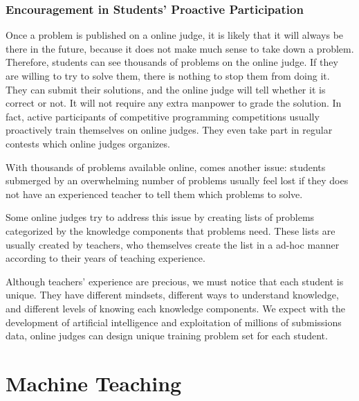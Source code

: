         \subsubsection{Encouragement in Students' Proactive Participation}

            Once a problem is published on a online judge,
            it is likely that it will always be there in the future,
            because it does not make much sense to take down a problem.
            Therefore, students can see thousands of problems on the online judge.
            If they are willing to try to solve them,
            there is nothing to stop them from doing it.
            They can submit their solutions,
            and the online judge will tell whether it is correct or not.
            It will not require any extra manpower to grade the solution.
            In fact, active participants of competitive programming competitions usually proactively
            train themselves on online judges.
            They even take part in regular contests which online judges organizes.

            With thousands of problems available online, comes another issue:
            students submerged by an overwhelming number of problems usually feel lost
            if they does not have an experienced teacher to tell them which problems to solve.

            Some online judges try to address this issue by creating lists of problems
            categorized by the knowledge components that problems need.
            These lists are usually created by teachers,
            who themselves create the list in a ad-hoc manner
            according to their years of teaching experience.

            Although teachers' experience are precious,
            we must notice that each student is unique.
            They have different mindsets, different ways to understand knowledge,
            and different levels of knowing each knowledge components.
            We expect with the development of artificial intelligence
            and exploitation of millions of submissions data,
            online judges can design unique training problem set for each student.


\section{Machine Teaching}

